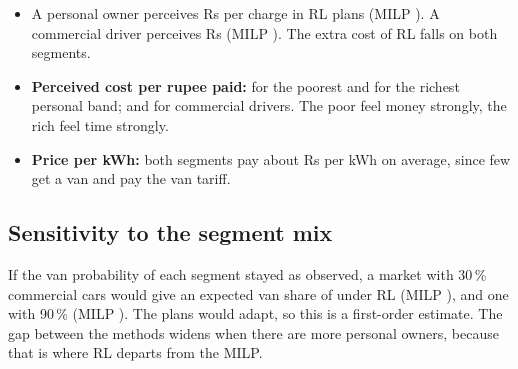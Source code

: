 

\begin{itemize}
  \item A personal owner perceives \PercEvPers{} Rs per charge in RL plans (MILP \PercEvMPers). A commercial driver perceives \PercEvComm{} Rs (MILP \PercEvMComm). The extra cost of RL falls on both segments.
  \item \textbf{Perceived cost per rupee paid:} \PerRsPoorPers{} for the poorest and \PerRsRichPers{} for the richest personal band; \PerRsPoorComm{} and \PerRsRichComm{} for commercial drivers. The poor feel money strongly, the rich feel time strongly.
  \item \textbf{Price per kWh:} both segments pay about \PaidKwhPers{} Rs per kWh on average, since few get a van and pay the van tariff.
\end{itemize}


\subsection{Sensitivity to the segment mix}


If the van probability of each segment stayed as observed, a market with 30\,\% commercial cars would give an expected van share of \MixRLThree\pct{} under RL (MILP \MixMThree\pct), and one with 90\,\% \MixRLNine\pct{} (MILP \MixMNine\pct). The plans would adapt, so this is a first-order estimate. The gap between the methods widens when there are more personal owners, because that is where RL departs from the MILP.


